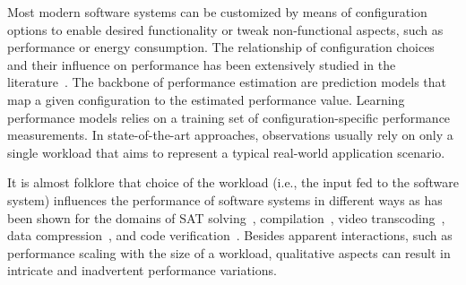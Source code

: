 
Most modern software systems can be customized by means of configuration options to  enable desired functionality or tweak non-functional aspects, such as  performance or energy consumption. The relationship of configuration choices and their influence on performance has been extensively studied in the literature~\cite{dorn2020,siegmundPerformanceinfluenceModelsHighly2015,haDeepPerf2019,perfAL,guoVariabilityawarePerformancePrediction2013,sarkarCostEfficientSamplingPerformance,guo_2018_data,fourier_learning_2015,perLasso,chen_hinnperf_2022}. The backbone of performance estimation are prediction models that map a given configuration to the estimated performance value. Learning performance models relies on a training set of configuration-specific performance measurements. In state-of-the-art approaches, observations usually rely on  only a single workload that aims to represent a typical real-world application scenario.

It is almost folklore that choice of the workload (i.e., the input fed to the software system) influences the performance of software systems in different ways as has been shown for the domains of SAT solving~\cite{falkner_sat_solvers_2015,satzilla_2008}, compilation~\cite{ding_compilation_2015,plotnikov_compilation_2013}, video transcoding~\cite{maxiaguine_workload_2004,alves_sampling_2020}, data compression~\cite{khavari_compression_2019}, and code verification~\cite{koc_satune_2021}. Besides apparent interactions, such as performance scaling with the size of a workload, qualitative aspects can result in intricate and inadvertent performance variations.

